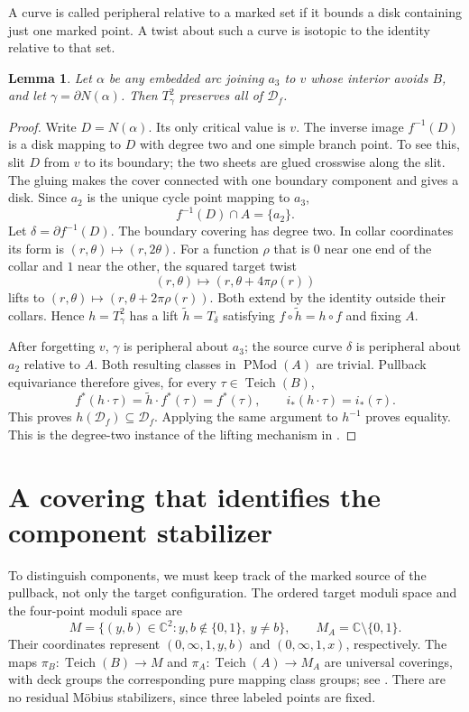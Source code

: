 \documentclass[11pt]{article}
\newcommand{\C}{\mathbb C}
\newcommand{\Teich}{\operatorname{Teich}}
\newcommand{\Mod}{\operatorname{PMod}}
\newcommand{\D}{\mathcal D}
\newtheorem{lemma}[theorem]{Lemma}
\theoremstyle{remark}
\begin{document}
A curve is called peripheral relative to a marked set if it bounds a disk containing just one marked point. A twist about such a curve is isotopic to the identity relative to that set.

\begin{lemma}\label{lem:preserve}
Let $\alpha$ be any embedded arc joining $a_3$ to $v$ whose interior avoids $B$, and let $\gamma=\partial N(\alpha)$. Then $T_\gamma^2$ preserves all of $\D_f$.
\end{lemma}
\begin{proof}
Write $D=N(\alpha)$. Its only critical value is $v$. The inverse image $f^{-1}(D)$ is a disk mapping to $D$ with degree two and one simple branch point. To see this, slit $D$ from $v$ to its boundary; the two sheets are glued crosswise along the slit. The gluing makes the cover connected with one boundary component and gives a disk. Since $a_2$ is the unique cycle point mapping to $a_3$,
\[
 f^{-1}(D)\cap A=\{a_2\}.
\]
Let $\delta=\partial f^{-1}(D)$. The boundary covering has degree two. In collar coordinates its form is $(r,\theta)\mapsto(r,2\theta)$. For a function $\rho$ that is $0$ near one end of the collar and $1$ near the other, the squared target twist
\[
 (r,\theta)\longmapsto(r,\theta+4\pi\rho(r))
\]
lifts to $(r,\theta)\mapsto(r,\theta+2\pi\rho(r))$. Both extend by the identity outside their collars. Hence $h=T_\gamma^2$ has a lift $\widetilde h=T_\delta$ satisfying $f\circ\widetilde h=h\circ f$ and fixing $A$.

After forgetting $v$, $\gamma$ is peripheral about $a_3$; the source curve $\delta$ is peripheral about $a_2$ relative to $A$. Both resulting classes in $\Mod(A)$ are trivial. Pullback equivariance therefore gives, for every $\tau\in\Teich(B)$,
\[
 f^*(h\cdot\tau)=\widetilde h\cdot f^*(\tau)=f^*(\tau),
 \qquad i_*(h\cdot\tau)=i_*(\tau).
\]
This proves $h(\D_f)\subseteq\D_f$. Applying the same argument to $h^{-1}$ proves equality. This is the degree-two instance of the lifting mechanism in \cite[Lemmas 5.3 and 5.5]{FKS}.
\end{proof}

\section{A covering that identifies the component stabilizer}
To distinguish components, we must keep track of the marked source of the pullback, not only the target configuration. The ordered target moduli space and the four-point moduli space are
\[
 M=\{(y,b)\in\C^2:y,b\notin\{0,1\},\ y\ne b\},\qquad
 M_A=\C\setminus\{0,1\}.
\]
Their coordinates represent $(0,\infty,1,y,b)$ and $(0,\infty,1,x)$, respectively. The maps $\pi_B:\Teich(B)\to M$ and $\pi_A:\Teich(A)\to M_A$ are universal coverings, with deck groups the corresponding pure mapping class groups; see \cite[Section 2.3]{HK}. There are no residual M\"obius stabilizers, since three labeled points are fixed.
\end{document}
